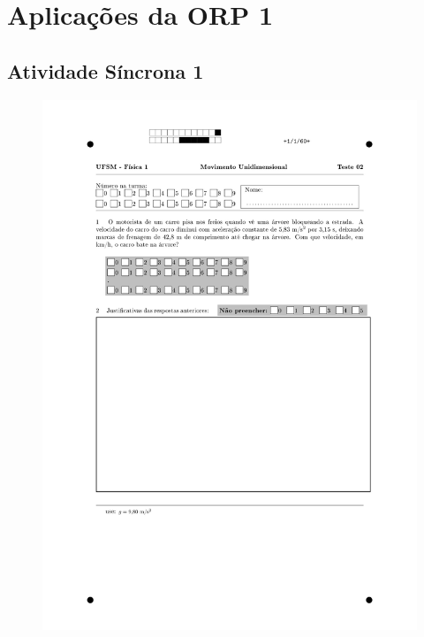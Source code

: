 \chapter{Aplicações da ORP 1}\label{ch:orp1}
\section{Atividade Síncrona 1}\label{ch:orp1e1}
\vspace*{\fill}
\begin{figure}[H]\centering
\includegraphics[scale=0.7]{fig/orp1q1_page-0001.jpg}
\end{figure}
\vspace*{\fill}
